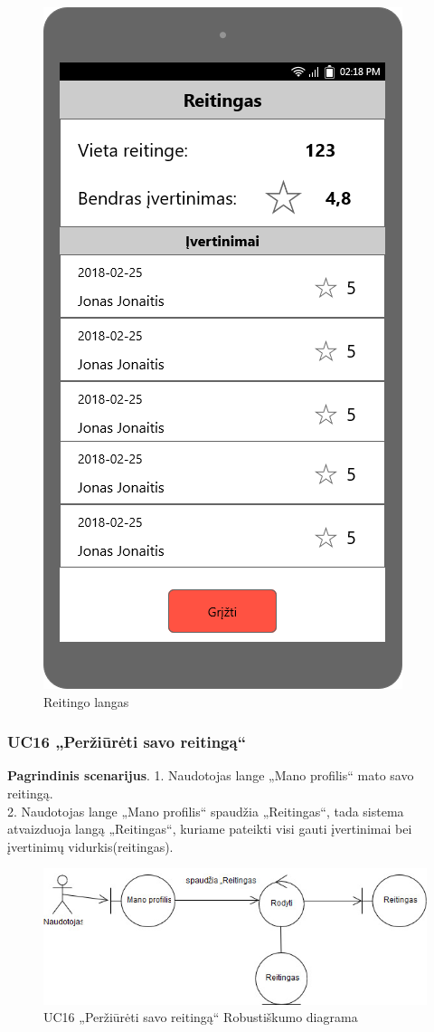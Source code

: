 \documentclass{VUMIFPSbakalaurinis}
\begin{document}
\begin{figure}[H]
	\centering
	\includegraphics[scale=0.4]{img/ScreenShots/Mano_profilis/06-Reitingas}
	\caption{Reitingo langas}
	\label{img:rating}
\end{figure}
\subsubsection{UC16 „Peržiūrėti savo reitingą“}
\textbf{Pagrindinis scenarijus}. 1. Naudotojas lange „Mano profilis“ mato savo reitingą. \\
2. Naudotojas lange „Mano profilis“ spaudžia „Reitingas“, tada sistema atvaizduoja langą „Reitingas“, kuriame pateikti visi gauti įvertinimai bei įvertinimų vidurkis(reitingas).

\begin{figure}[H]
	\centering
	\includegraphics[scale=0.6]{img/Robustness/UC16}
	\caption{UC16 „Peržiūrėti savo reitingą“ Robustiškumo diagrama}
	\label{img:uc16rob}
\end{figure}
\end{document}
